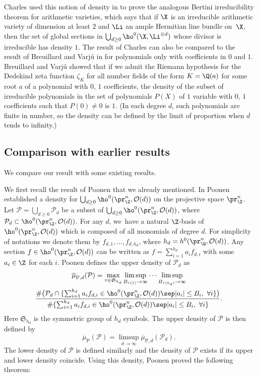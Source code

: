 Charles used this notion of density in \cite{Ch17} to prove the analogous Bertini irreducibility theorem for arithmetic varieties, which says that if $\X$ is an irreducible arithmetic variety of dimension at least $2$ and $\Li$ an ample Hermitian line bundle on~$\X$, then the set of global sections in $\bigcup_{d\geq 0}\ho^0(\X, \Li^{\otimes d})$ whose divisor is irreducible has density $1$.
The result of Charles can also be compared to the result of Breuillard and Varjú in \cite{BV19} for polynomials only with coefficients in $0$ and $1$. Breuillard and Varjú showed that if we admit the Riemann hypothesis for the Dedekind zeta function $\zeta_K$ for all number fields of the form $K=\Q(a)$ for some root $a$ of a polynomial with $0$, $1$ coefficients, the density of the subset of irreducible polynomials in the set of polynomials $P(X)$ of $1$ variable with $0$, $1$ coefficients such that $P(0)\not=0$ is $1$. (In each degree $d$, such polynomials are finite in number, so the density can be defined by the limit of proportion when $d$ tends to infinity.) 

\subsection{Comparison with earlier results}
We compare our result with some existing results.

We first recall the result of Poonen that we already mentioned. In \cite{Po04} Poonen established a density for $\bigcup_{d\geq 0}\ho^0(\pr^n_{\Z}, \mathcal{O}(d))$ on the projective space $\pr^n_{\Z}$. Let $\mathcal{P}=\bigcup_{d\geq 0}\mathcal{P}_d$ be a subset of $\bigcup_{d\geq 0}\ho^0(\pr^n_{\Z}, \mathcal{O}(d))$, where $\mathcal{P}_d\subset \ho^0(\pr^n_{\Z}, \mathcal{O}(d))$. For any $d$, we~have a natural $\Z$-basis of $\ho^0(\pr^n_{\Z}, \mathcal{O}(d))$ which is composed of all monomials of degree $d$. For simplicity of notations we denote them by $f_{d,1},\dots, f_{d,h_d}$, where $h_d=\nobreak h^0(\pr^n_{\Q}, \mathcal{O}(d))$. Any section $f\in \ho^0(\pr^n_{\Z}, \mathcal{O}(d))$ can be written as $f=\sum_{i=1}^{h_d}a_if_{d,i}$ with some $a_i\in \Z$ for each $i$. Poonen defines the upper density of $\mathcal{P}_d$ as
\begin{multline*}
\overline{\mu}_{\mathrm{P},d}(\mathcal{P})=\max_{\tau\in \mathfrak{S}_{h_d}}\limsup_{B_{\tau(1)}\to \infty}\cdots \limsup_{B_{\tau(h_d)}\to \infty}\\
\frac{\#\bigl(\mathcal{P}_d\cap \{ \sum_{i=1}^{h_d}a_if_{d,i}\in \ho^0(\pr^n_{\Z}, \mathcal{O}(d))\sep |a_i|\leq B_i,\ \forall i \}\bigr)}{\#\{ \sum_{i=1}^{h_d}a_if_{d,i}\in \ho^0(\pr^n_{\Z}, \mathcal{O}(d))\sep |a_i|\leq B_i,\ \forall i \}}.
\end{multline*}
Here $\mathfrak{S}_{h_d}$ is the symmetric group of $h_d$ symbols. The upper density of $\mathcal{P}$ is then defined by
\[
\overline{\mu}_{\mathrm{P}}(\mathcal{P})=\limsup_{d\to \infty} \overline{\mu}_{\mathrm{P},d}(\mathcal{P}_d).
\]
The lower density of $\mathcal{P}$ is defined similarly and the density of $\mathcal{P}$ exists if its upper and lower density coincide. Using this density, Poonen proved the following theorem:

